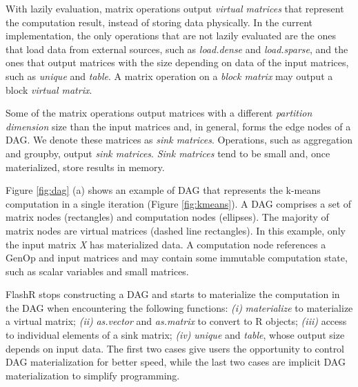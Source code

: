 With lazily evaluation, matrix operations
output \textit{virtual matrices} that represent the computation result,
instead of storing data physically. In the current implementation,
the only operations that are not lazily evaluated are the ones that
load data from external sources, such as \textit{load.dense} and
\textit{load.sparse}, and the ones that output matrices
with the size depending on data of the input matrices, such as \textit{unique}
and \textit{table}. A matrix operation on a \textit{block matrix} may output
a block \textit{virtual matrix}.


Some of the matrix operations output matrices with
a different \textit{partition dimension} size than the input matrices and,
in general, forms the edge nodes of a DAG. We denote these matrices as
\textit{sink matrices}. Operations, such as aggregation and groupby,
output \textit{sink matrices}. \textit{Sink matrices} tend to be small and,
once materialized, store results in memory.

Figure \ref{fig:dag} (a) shows an example of DAG that represents the k-means
computation in a single iteration (Figure \ref{fig:kmeans}).
A DAG comprises a set of
matrix nodes (rectangles) and computation nodes (ellipses). The majority of
matrix nodes are virtual matrices (dashed line rectangles).
In this example, only the input matrix \textit{X} has materialized data.
A computation node references a GenOp and input matrices and
may contain some immutable computation state, such as scalar variables and
small matrices. 

FlashR stops constructing a DAG and starts to materialize the computation
in the DAG when encountering the following functions: \textit{(i)}
\textit{materialize} to materialize a virtual matrix;
\textit{(ii)} \textit{as.vector} and \textit{as.matrix} to convert
to R objects; \textit{(iii)} access to individual elements of a sink matrix;
\textit{(iv)} \textit{unique} and \textit{table},
whose output size depends on input data. The first two cases
give users the opportunity to control DAG materialization for better speed,
while the last two cases are implicit DAG materialization to simplify programming.

